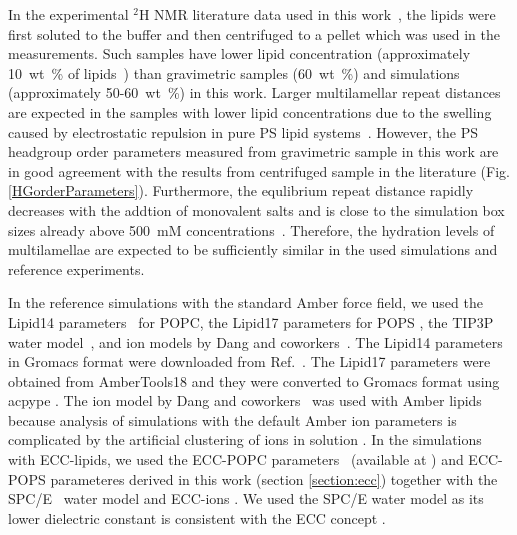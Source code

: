 \documentclass[journal=jpcbfk,manuscript=article]{achemso}
\begin{document}
In the experimental $^2$H NMR literature data used in this work~\cite{browning80,roux90},
the lipids were first soluted to the buffer and then centrifuged to a pellet which
was used in the measurements. Such samples have lower lipid concentration
(approximately 10~wt~\% of lipids~\cite{browning80,roux88,roux90}) than 
gravimetric samples (60~wt~\%) and simulations (approximately 50-60~wt~\%) in this work.
Larger multilamellar repeat distances are expected in the samples with lower lipid
concentrations due to the swelling caused by electrostatic repulsion in pure PS lipid systems~\cite{millman82}.
However, the PS headgroup order parameters measured from gravimetric sample in this work
are in good agreement with the results from centrifuged sample in the literature \cite{browning80} (Fig. \ref{HGorderParameters}).
Furthermore, the equlibrium repeat distance rapidly decreases with the addtion of monovalent
salts and is close to the simulation box sizes already above 500~mM concentrations~\cite{millman82,rand89}.
Therefore, the hydration levels of multilamellae are expected to be sufficiently similar
in the used simulations and reference experiments.


In the reference simulations with the standard Amber force field,
we used the Lipid14 parameters~\cite{dickson14} for POPC, the Lipid17 parameters for POPS \cite{lipid17-future},
the TIP3P water model~\cite{jorgensen83}, and ion models by Dang and coworkers~\cite{smith94,chang1999,dang2006}.
The Lipid14 parameters in Gromacs format were downloaded from Ref.~. 
The Lipid17 parameters were obtained from AmberTools18 \cite{amber18} 
and they were converted to Gromacs format using acpype \cite{acpype}.  
The ion model by Dang and coworkers~\cite{smith94,chang1999,dang2006} was used with Amber lipids because
analysis of simulations with the default Amber ion parameters is complicated by the artificial
clustering of ions in solution \cite{nmrlipids_proj4}.
In the simulations with ECC-lipids,
we used the ECC-POPC parameters~\cite{melcr18} (available at \cite{ECC-POPC_nacl_cacl2_files}) and 
ECC-POPS parameteres derived in this work (section \ref{section:ecc}) 
together with the SPC/E~\cite{Berendsen1987} water model and 
ECC-ions \cite{martinek17, kohagen16, Pluharova2014}.
We used the SPC/E water model as its lower dielectric constant is consistent with the
ECC concept \cite{leontyev11,leontyev14}.
\end{document}
